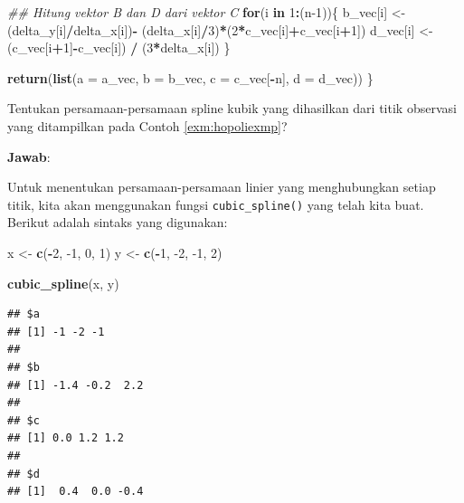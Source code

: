 \documentclass[]{book}
\newenvironment{Shaded}{\begin{snugshade}}{\end{snugshade}}
\newcommand{\CommentTok}[1]{\textcolor[rgb]{0.56,0.35,0.01}{\textit{#1}}}
\newcommand{\ControlFlowTok}[1]{\textcolor[rgb]{0.13,0.29,0.53}{\textbf{#1}}}
\newcommand{\DataTypeTok}[1]{\textcolor[rgb]{0.13,0.29,0.53}{#1}}
\newcommand{\DecValTok}[1]{\textcolor[rgb]{0.00,0.00,0.81}{#1}}
\newcommand{\KeywordTok}[1]{\textcolor[rgb]{0.13,0.29,0.53}{\textbf{#1}}}
\newcommand{\NormalTok}[1]{#1}
\newcommand{\OperatorTok}[1]{\textcolor[rgb]{0.81,0.36,0.00}{\textbf{#1}}}
\newcommand{\StringTok}[1]{\textcolor[rgb]{0.31,0.60,0.02}{#1}}
\theoremstyle{definition}
\theoremstyle{definition}
\theoremstyle{definition}
\theoremstyle{remark}
\let\BeginKnitrBlock\begin \let\EndKnitrBlock\end
\begin{document}
\begin{Shaded}
\begin{Highlighting}[]
 \CommentTok{## Hitung vektor B dan D dari vektor C}
 \ControlFlowTok{for}\NormalTok{(i }\ControlFlowTok{in} \DecValTok{1}\OperatorTok{:}\NormalTok{(n}\DecValTok{-1}\NormalTok{))\{}
\NormalTok{   b_vec[i] <-}\StringTok{ }\NormalTok{(delta_y[i]}\OperatorTok{/}\NormalTok{delta_x[i])}\OperatorTok{-}
\StringTok{               }\NormalTok{(delta_x[i]}\OperatorTok{/}\DecValTok{3}\NormalTok{)}\OperatorTok{*}\NormalTok{(}\DecValTok{2}\OperatorTok{*}\NormalTok{c_vec[i]}\OperatorTok{+}\NormalTok{c_vec[i}\OperatorTok{+}\DecValTok{1}\NormalTok{])}
\NormalTok{   d_vec[i] <-}\StringTok{ }\NormalTok{(c_vec[i}\OperatorTok{+}\DecValTok{1}\NormalTok{]}\OperatorTok{-}\NormalTok{c_vec[i]) }\OperatorTok{/}\StringTok{ }\NormalTok{(}\DecValTok{3}\OperatorTok{*}\NormalTok{delta_x[i])}
\NormalTok{ \}}
  
 \KeywordTok{return}\NormalTok{(}\KeywordTok{list}\NormalTok{(}\DataTypeTok{a =}\NormalTok{ a_vec, }\DataTypeTok{b =}\NormalTok{ b_vec, }\DataTypeTok{c =}\NormalTok{ c_vec[}\OperatorTok{-}\NormalTok{n], }\DataTypeTok{d =}\NormalTok{ d_vec))}
\NormalTok{\}}
\end{Highlighting}
\end{Shaded}

\BeginKnitrBlock{example}
\protect\hypertarget{exm:cubicsplineexm}{}{\label{exm:cubicsplineexm} }Tentukan persamaan-persamaan spline kubik yang dihasilkan dari titik observasi yang ditampilkan pada Contoh \ref{exm:hopoliexmp}?
\EndKnitrBlock{example}

\textbf{Jawab}:

Untuk menentukan persamaan-persamaan linier yang menghubungkan setiap titik, kita akan menggunakan fungsi \texttt{cubic\_spline()} yang telah kita buat. Berikut adalah sintaks yang digunakan:

\begin{Shaded}
\begin{Highlighting}[]
\NormalTok{x <-}\StringTok{ }\KeywordTok{c}\NormalTok{(}\OperatorTok{-}\DecValTok{2}\NormalTok{, }\DecValTok{-1}\NormalTok{, }\DecValTok{0}\NormalTok{, }\DecValTok{1}\NormalTok{)}
\NormalTok{y <-}\StringTok{ }\KeywordTok{c}\NormalTok{(}\OperatorTok{-}\DecValTok{1}\NormalTok{, }\DecValTok{-2}\NormalTok{, }\DecValTok{-1}\NormalTok{, }\DecValTok{2}\NormalTok{)}

\KeywordTok{cubic_spline}\NormalTok{(x, y)}
\end{Highlighting}
\end{Shaded}

\begin{verbatim}
## $a
## [1] -1 -2 -1
## 
## $b
## [1] -1.4 -0.2  2.2
## 
## $c
## [1] 0.0 1.2 1.2
## 
## $d
## [1]  0.4  0.0 -0.4
\end{verbatim}
\end{document}
